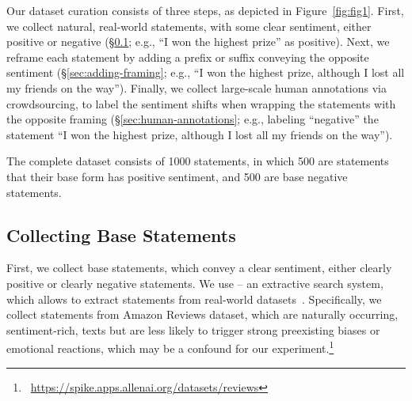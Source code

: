 

% 


Our dataset curation consists of three steps, as depicted in Figure~\ref{fig:fig1}. First, we collect natural, real-world statements, with some clear sentiment, either positive or negative (\S\ref{sec:base-statements}; e.g., ``I won the highest prize'' as positive). Next, 
we reframe each statement by adding a prefix or suffix conveying the opposite sentiment
(\S\ref{sec:adding-framing}; e.g., ``I won the highest prize, although I lost all my friends on the way''). Finally, we collect large-scale human annotations via crowdsourcing, to label the sentiment shifts when wrapping the statements with the opposite framing (\S\ref{sec:human-annotations}; e.g., labeling ``negative'' the statement ``I won the highest prize, although I lost all my friends on the way''). 

The complete dataset consists of 1000 statements, in which 500 are statements that their base form has positive sentiment, and 500 are base negative statements. 




\subsection{Collecting Base Statements}\label{sec:base-statements}
First, we collect base statements, which convey a clear sentiment, either clearly positive or clearly negative statements. We use \spike{} -- an extractive search system, which allows to extract statements from real-world datasets~\cite{taub-tabib-etal-2020-interactive}.
Specifically, we collect statements from Amazon Reviews dataset, which are naturally occurring, sentiment-rich, texts but are less likely to trigger strong preexisting biases or emotional reactions, which may be a confound for our experiment.\footnote{~\url{https://spike.apps.allenai.org/datasets/reviews}} 



